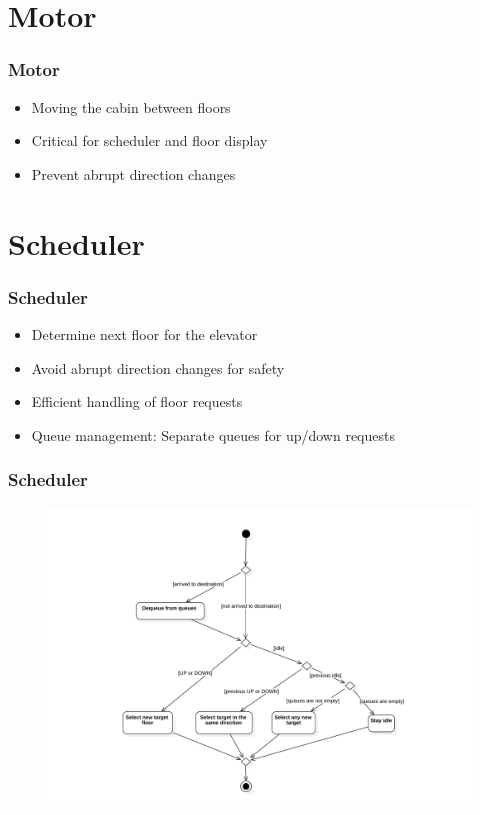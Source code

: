 \documentclass{beamer}
\begin{document}
\section{Motor}
\begin{frame}
    \frametitle{Motor}
    \begin{itemize}
        \item Moving the cabin between floors
        \item Critical for scheduler and floor display
        \item Prevent abrupt direction changes
    \end{itemize}
\end{frame}

\section{Scheduler}
\begin{frame}
    \frametitle{Scheduler}
    \begin{itemize}
        \item Determine next floor for the elevator
        \item Avoid abrupt direction changes for safety
        \item Efficient handling of floor requests
        \item Queue management: Separate queues for up/down requests
    \end{itemize}
\end{frame}

\begin{frame}
    \frametitle{Scheduler}
    \begin{figure}[h]
        \centering
        \includegraphics[width=\textwidth]{assets/scheduler.pdf}
    \end{figure}
\end{frame}
\end{document}
